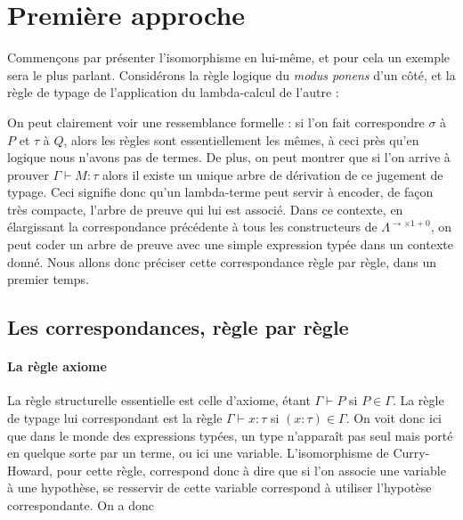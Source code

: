 \section{Première approche}

Commençons par présenter l'isomorphisme en lui-même, et pour cela un exemple sera le plus parlant. Considérons la règle logique du \textit{modus ponens} d'un côté, et la règle de typage de l'application du lambda-calcul de l'autre :

\begin{center}
    \begin{prooftree}
    \end{prooftree}
    \qquad
    \qquad
    \begin{prooftree}
    \end{prooftree}
\end{center}

On peut clairement voir une ressemblance formelle : si l'on fait correspondre $\sigma$ à $P$ et $\tau$ à $Q$, alors les règles sont essentiellement les mêmes, à ceci près qu'en logique nous n'avons pas de termes. De plus, on peut montrer que si l'on arrive à prouver $\Gamma\vdash M : \tau$ alors il existe un unique arbre de dérivation de ce jugement de typage. Ceci signifie donc qu'un lambda-terme peut servir à encoder, de façon très compacte, l'arbre de preuve qui lui est associé. Dans ce contexte, en élargissant la correspondance précédente à tous les constructeurs de $\Lambda^{\to\times 1+0}$, on peut coder un arbre de preuve avec une simple expression typée dans un contexte donné. Nous allons donc préciser cette correspondance règle par règle, dans un premier temps.

\subsection{Les correspondances, règle par règle}

\paragraph{La règle axiome}

La règle structurelle essentielle est celle d'axiome, étant $\Gamma\vdash P$ si $P\in \Gamma$. La règle de typage lui correspondant est la règle $\Gamma\vdash x : \tau$ si $(x : \tau)\in\Gamma$. On voit donc ici que dans le monde des expressions typées, un type n'apparaît pas seul mais \og porté\fg{} en quelque sorte par un terme, ou ici une variable. L'isomorphisme de Curry-Howard, pour cette règle, correspond donc à dire que si l'on associe une variable à une hypothèse, se resservir de cette variable correspond à utiliser l'hypotèse correspondante. On a donc 

